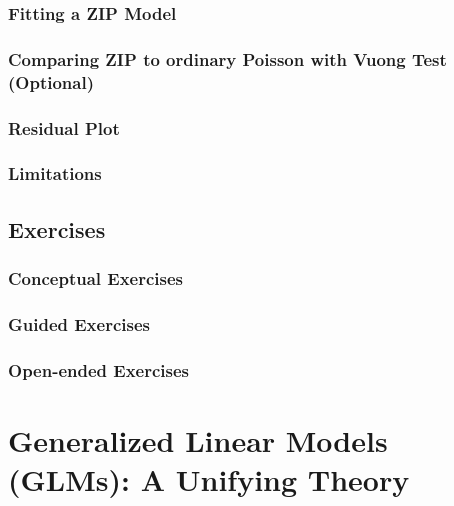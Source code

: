 \documentclass[
]{krantz}
\begin{document}
\hypertarget{fitting-a-zip-model}{%
\subsection{Fitting a ZIP Model}\label{fitting-a-zip-model}}

\hypertarget{comparing-zip-to-ordinary-poisson-with-vuong-test-optional}{%
\subsection{Comparing ZIP to ordinary Poisson with Vuong Test (Optional)}\label{comparing-zip-to-ordinary-poisson-with-vuong-test-optional}}

\hypertarget{residual-plot}{%
\subsection{Residual Plot}\label{residual-plot}}

\hypertarget{limitations}{%
\subsection{Limitations}\label{limitations}}

\hypertarget{exercises-3}{%
\section{Exercises}\label{exercises-3}}

\hypertarget{exer:concept}{%
\subsection{Conceptual Exercises}\label{exer:concept}}

\hypertarget{guided-exercises-2}{%
\subsection{Guided Exercises}\label{guided-exercises-2}}

\hypertarget{open-ended-exercises-1}{%
\subsection{Open-ended Exercises}\label{open-ended-exercises-1}}

\hypertarget{ch-glms}{%
\chapter{Generalized Linear Models (GLMs): A Unifying Theory}\label{ch-glms}}
\end{document}
